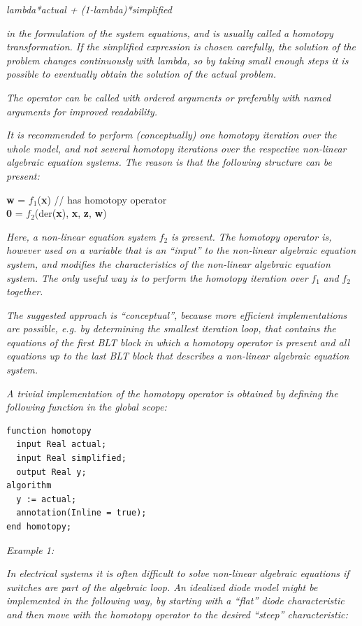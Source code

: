 \documentclass[10pt,a4paper]{report}
\begin{document}
\emph{lambda*actual + (1-lambda)*simplified}

\emph{in the formulation of the system equations, and is usually called
a homotopy transformation. If the simplified expression is chosen
carefully, the solution of the problem changes continuously with lambda,
so by taking small enough steps it is possible to eventually obtain the
solution of the actual problem.}

\emph{The operator can be called with ordered arguments or preferably
with named arguments for improved readability.}

\emph{It is recommended to perform (conceptually) one homotopy iteration
over the whole model, and not several homotopy iterations over the
respective non-linear algebraic equation systems. The reason is that the
following structure can be present:}

\textbf{w} = $f_1$(\textbf{x}) // has homotopy
operator\\
\textbf{0} = $f_2$(der(\textbf{x}), \textbf{x},
\textbf{z}, \textbf{w})

\emph{Here, a non-linear equation system} $f_2$
\emph{is present. The homotopy operator is, however used on a variable
that is an ``input'' to the non-linear algebraic equation system, and
modifies the characteristics of the non-linear algebraic equation
system. The only useful way is to perform the homotopy iteration over}
$f_1$ \emph{and} $f_2$
\emph{together.}

\emph{The suggested approach is ``conceptual'', because more efficient
implementations are possible, e.g. by determining the smallest iteration
loop, that contains the equations of the first BLT block in which a
homotopy operator is present and all equations up to the last BLT block
that describes a non-linear algebraic equation system.}

\emph{A trivial implementation of the homotopy operator is obtained by
defining the following function in the global scope:}

\begin{lstlisting}[language=modelica]
function homotopy
  input Real actual;
  input Real simplified;
  output Real y;
algorithm
  y := actual;
  annotation(Inline = true);
end homotopy;
\end{lstlisting}

\emph{Example 1:}

\emph{In electrical systems it is often difficult to solve non-linear
algebraic equations if switches are part of the algebraic loop. An
idealized diode model might be implemented in the following way, by
starting with a ``flat'' diode characteristic and then move with the
homotopy operator to the desired ``steep'' characteristic:}
\end{document}
